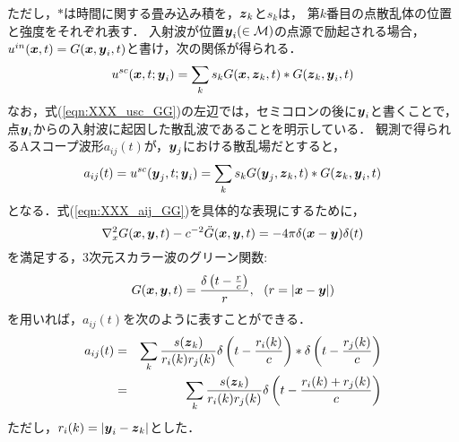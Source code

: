 ただし，$*$は時間に関する畳み込み積を，$\mbox{\boldmath $z$}_k$と$s_k$は，
第$k$番目の点散乱体の位置と強度をそれぞれ表す．
入射波が位置$\mbox{\boldmath $y$}_i(\in {\cal M})$の点源で励起される場合，
$u^{in}(\mbox{\boldmath $x$},t)=G(\mbox{\boldmath $x$},\mbox{\boldmath $y$}_i,t)$と書け，次の関係が得られる．
\begin{equation}
	u^{sc}(\mbox{\boldmath $x$},t;\mbox{\boldmath $y$}_{i})=\sum_k s_k G(\mbox{\boldmath $x$},\mbox{\boldmath $z$}_k,t)*G(\mbox{\boldmath $z$}_k,\mbox{\boldmath $y$}_i,t)
	\label{eqn:XXX_usc_GG}
\end{equation}
なお，式(\ref{eqn:XXX_usc_GG})の左辺では，セミコロンの後に$\mbox{\boldmath $y$}_i$と書くことで，
点$\mbox{\boldmath $y$}_i$からの入射波に起因した散乱波であることを明示している．
観測で得られるAスコープ波形$a_{ij}(t)$が，$\mbox{\boldmath $y$}_j$における散乱場だとすると，
\begin{equation}
	a_{ij}(t)
	=u^{sc}(\mbox{\boldmath $y$}_j,t;\mbox{\boldmath $y$}_i)
	=\sum_k s_k G(\mbox{\boldmath $y$}_j,\mbox{\boldmath $z$}_k,t)*G(\mbox{\boldmath $z$}_k,\mbox{\boldmath $y$}_i,t)
	\label{eqn:XXX_aij_GG}
\end{equation}
となる．式(\ref{eqn:XXX_aij_GG})を具体的な表現にするために，
\begin{equation}
	\nabla^2_x G(\mbox{\boldmath $x$},\mbox{\boldmath $y$},t) -c^{-2}\ddot{G}(\mbox{\boldmath $x$},\mbox{\boldmath $y$},t)
	=-4\pi \delta(\mbox{\boldmath $x$}-\mbox{\boldmath $y$})\delta(t)
	\label{eqn:XXX_wveq_Gt}
\end{equation}
を満足する，3次元スカラー波のグリーン関数:
\begin{equation}
	G(\mbox{\boldmath $x$},\mbox{\boldmath $y$},t)=
	\frac{\delta\left(t-\frac{r}{c}\right)}{r}, 
	\ \ (r=\left| \mbox{\boldmath $x$}-\mbox{\boldmath $y$}\right|)
	\label{eqn:}
\end{equation}
を用いれば，$a_{ij}(t)$を次のように表すことができる．
\begin{eqnarray}
	a_{ij}(t)
	&=&
	\sum_{k}
	\frac{ s(\mbox{\boldmath $z$}_k) }{ r_i(k)r_j(k) }
	\delta\left(t-\frac{r_i(k)}{c}\right) * \delta\left( t-\frac{r_j(k)}{c}\right)\\
	\label{eqn:}
	&=&
	\sum_k
	\frac{ s(\mbox{\boldmath $z$}_k) }{ r_i(k)r_j(k) }
	\delta\left(t-\frac{r_i(k)+r_j(k)}{c}\right) 
	\label{eqn:XXX_aijt}
\end{eqnarray}
ただし，$r_i(k)=\left| \mbox{\boldmath $y$}_i-\mbox{\boldmath $z$}_k\right|$とした．

